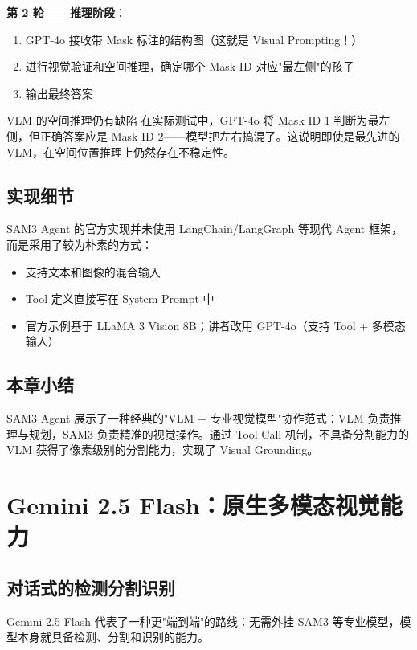 \documentclass[a4paper]{article}
\begin{document}
\textbf{第 2 轮——推理阶段}：
\begin{enumerate}
    \item GPT-4o 接收带 Mask 标注的结构图（这就是 Visual Prompting！）
    \item 进行视觉验证和空间推理，确定哪个 Mask ID 对应"最左侧"的孩子
    \item 输出最终答案
\end{enumerate}

\begin{warningbox}{VLM 的空间推理仍有缺陷}
在实际测试中，GPT-4o 将 Mask ID 1 判断为最左侧，但正确答案应是 Mask ID 2——模型把左右搞混了。这说明即使是最先进的 VLM，在空间位置推理上仍然存在不稳定性。
\end{warningbox}

\subsection{实现细节}

SAM3 Agent 的官方实现并未使用 LangChain/LangGraph 等现代 Agent 框架，而是采用了较为朴素的方式：

\begin{itemize}
    \item 支持文本和图像的混合输入
    \item Tool 定义直接写在 System Prompt 中
    \item 官方示例基于 LLaMA 3 Vision 8B；讲者改用 GPT-4o（支持 Tool + 多模态输入）
\end{itemize}

\subsection{本章小结}

SAM3 Agent 展示了一种经典的"VLM + 专业视觉模型"协作范式：VLM 负责推理与规划，SAM3 负责精准的视觉操作。通过 Tool Call 机制，不具备分割能力的 VLM 获得了像素级别的分割能力，实现了 Visual Grounding。


\section{Gemini 2.5 Flash：原生多模态视觉能力}

\subsection{对话式的检测分割识别}

Gemini 2.5 Flash 代表了一种更"端到端"的路线：无需外挂 SAM3 等专业模型，模型本身就具备检测、分割和识别的能力。
\end{document}

